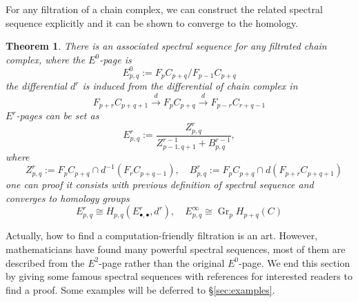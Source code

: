 \documentclass[a4paper,11pt]{article}
\newtheorem{theorem}{Theorem}[section]
\theoremstyle{definition}
\theoremstyle{remark}
\begin{document}
For any filtration of a chain complex, we can construct the related spectral sequence explicitly and it can be shown to converge to the homology.
\begin{theorem}\label{theorem:1.5}
	There is an associated spectral sequence for any filtrated chain complex, where the $E^0$-page is
	\[
	E^0_{p,q}:= F_p C_{p+q}/F_{p-1}C_{p+q}
	\]
	the differential $d^r$ is induced from the differential of chain complex in
	\[
	F_{p+r}C_{p+q+1}\xrightarrow{d}F_{p}C_{p+q}\xrightarrow{d} F_{p-r}C_{r+q-1}
	\]
	$E^r$-pages can be set as
	\begin{equation}\label{eq:2}
	E^{r}_{p,q}:=\frac{Z^r_{p,q}}{Z^{r-1}_{p-1,q+1}+B^{r-1}_{p,q}},
	\end{equation}
	where
	\[
	\quad  Z_{p,q}^r:=F_pC_{p+q}\cap d^{-1}(F_rC_{p+q-1}),\quad B^r_{p,q}:=F_pC_{p+q}\cap d(F_{p+r}C_{p+q+1})
	\]
	one can proof it consists with previous definition of spectral sequence and converges to homology groups
	\[
	E_{p,q}^r\cong H_{p,q}(E^r_{\bullet,\bullet},d^r),\quad E^{\infty}_{p,q}\cong\operatorname{Gr}_pH_{p+q}(C)
	\]
\end{theorem}

Actually, how to find a computation-friendly filtration is an art. However, mathematicians have found many powerful spectral sequences, most of them are described from the $E^2$-page rather than the original $E^0$-page. We end this section by giving some famous spectral sequences with references for interested readers to find a proof. Some examples will be deferred to \S\ref{sec:examples}.
\end{document}
